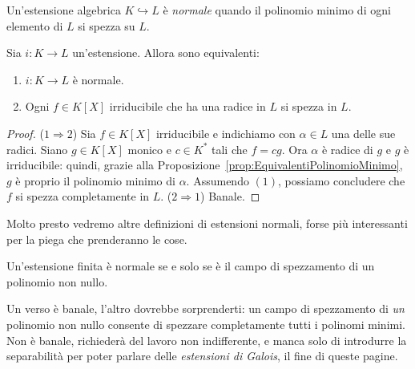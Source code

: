 \begin{defi}
Un'estensione algebrica $K \hookrightarrow L$ è {\em normale} quando il polinomio minimo di ogni elemento di $L$ si spezza su $L$.
\end{defi}


\begin{prop}
Sia $i : K \to L$ un'estensione. Allora sono equivalenti:
\begin{enumerate}
\item $i : K \to L$ è normale.
\item Ogni $f \in K[X]$ irriducibile che ha una radice in $L$ si spezza in $L$. 
\end{enumerate}
\end{prop}

\begin{proof}
($1 \Rightarrow 2$) Sia $f \in K[X]$ irriducibile e indichiamo con $\alpha \in L$ una delle sue radici. Siano $g \in K[X]$ monico e $c \in K^\ast$ tali che $f = c g$. Ora $\alpha$ è radice di $g$ e $g$ è irriducibile: quindi, grazie alla Proposizione~\ref{prop:EquivalentiPolinomioMinimo}, $g$ è proprio il polinomio minimo di $\alpha$. Assumendo $(1)$, possiamo concludere che $f$ si spezza completamente in $L$.\newline
($2 \Rightarrow 1$) Banale.
\end{proof}


Molto presto vedremo altre definizioni di estensioni normali, forse più interessanti per la piega che prenderanno le cose.

\begin{prop}
Un'estensione finita è normale se e solo se è il campo di spezzamento di un polinomio non nullo.
\end{prop}

Un verso è banale, l'altro dovrebbe sorprenderti: un campo di spezzamento di {\em un} polinomio non nullo consente di spezzare completamente tutti i polinomi minimi. Non è banale, richiederà del lavoro non indifferente, e manca solo di introdurre la separabilità per poter parlare delle {\em estensioni di Galois}, il fine di queste pagine.

